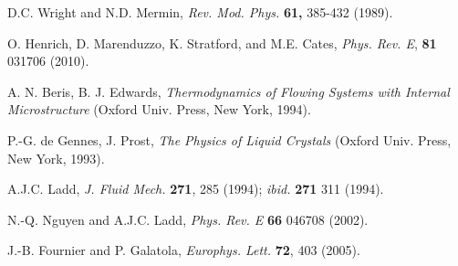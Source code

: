 \documentclass[12pt,twoside]{article}
\begin{document}
\begin{thebibliography}{99}

D.C. Wright and N.D. Mermin,
{\it Rev. Mod. Phys.} {\bf 61,} 385-432 (1989).




O. Henrich, D. Marenduzzo, K. Stratford, and M.E. Cates,
\textit{Phys. Rev. E}, \textbf{81} 031706 (2010).

A. N. Beris, B. J. Edwards, 
{\it Thermodynamics of Flowing Systems with Internal Microstructure}
(Oxford Univ. Press, New York, 1994).

P.-G. de Gennes, J. Prost,
{\it The Physics of Liquid Crystals} (Oxford Univ. Press, New York, 1993).

A.J.C. Ladd,
\textit{J. Fluid Mech.} \textbf{271}, 285 (1994); \textit{ibid.} \textbf{271}
311 (1994).

N.-Q. Nguyen and A.J.C. Ladd,
\textit{Phys. Rev. E} \textbf{66} 046708 (2002).

J.-B. Fournier and P. Galatola,
\textit{Europhys. Lett.} \textbf{72}, 403 (2005).

\end{thebibliography}
\end{document}
